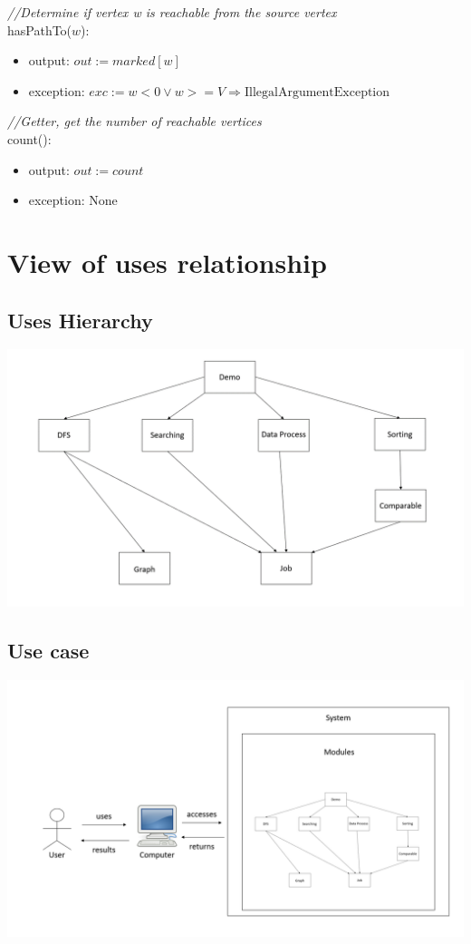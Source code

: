 \documentclass[12pt]{article}
\begin{document}
\noindent \textit{//Determine if vertex w is reachable from the source vertex}\\
\noindent hasPathTo($w$):
\begin{itemize}
\item output: $out := marked[w]$
\item exception: $exc := w < 0 \lor w >= V \Rightarrow \mbox{IllegalArgumentException}$
\end{itemize}

\noindent \textit{//Getter, get the number of reachable vertices}\\
\noindent count():
\begin{itemize}
\item output: $out := count$
\item exception: None
\end{itemize}
\newpage

\section{View of uses relationship}
\subsection*{Uses Hierarchy}
\begin{center}
\includegraphics[scale = 0.5]{usesHierarchy.png}
\end{center}
\subsection*{Use case}
\begin{center}
\includegraphics[scale = 0.5]{useCase.png}
\end{center}
\end{document}

